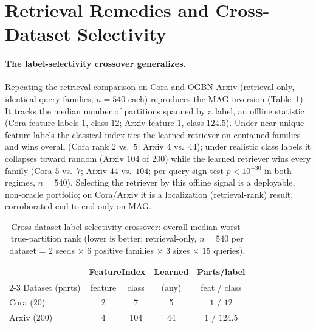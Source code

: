 \documentclass{article}
\begin{document}
\section{Retrieval Remedies and Cross-Dataset Selectivity}
\label{app:probes}

\paragraph{The label-selectivity crossover generalizes.} Repeating the retrieval comparison on Cora and OGBN-Arxiv (retrieval-only, identical query families, $n{=}540$ each) reproduces the MAG inversion (Table~\ref{tab:selectivity_xd_log}). It tracks the median number of partitions spanned by a label, an offline statistic (Cora feature labels $1$, class $12$; Arxiv feature $1$, class $124.5$). Under near-unique feature labels the classical index ties the learned retriever on contained families and wins overall (Cora rank $2$ vs.\ $5$; Arxiv $4$ vs.\ $44$); under realistic class labels it collapses toward random (Arxiv $104$ of $200$) while the learned retriever wins every family (Cora $5$ vs.\ $7$; Arxiv $44$ vs.\ $104$; per-query sign test $p<10^{-30}$ in both regimes, $n{=}540$). Selecting the retriever by this offline signal is a deployable, non-oracle portfolio; on Cora/Arxiv it is a localization (retrieval-rank) result, corroborated end-to-end only on MAG.

\begin{table}[H]
\centering
\caption{Cross-dataset label-selectivity crossover: overall median worst-true-partition rank (lower is better; retrieval-only, $n{=}540$ per dataset = 2 seeds $\times$ 6 positive families $\times$ 3 sizes $\times$ 15 queries).}
\label{tab:selectivity_xd_log}
\small
\begin{tabular}{lcccc}
\toprule
 & \multicolumn{2}{c}{FeatureIndex} & Learned & Parts/label \\
\cmidrule(lr){2-3}
Dataset (parts) & feature & class & (any) & feat / class \\
\midrule
Cora ($20$)   & 2 & 7   & 5  & $1$ / $12$ \\
Arxiv ($200$) & 4 & 104 & 44 & $1$ / $124.5$ \\
\bottomrule
\end{tabular}
\end{table}
\end{document}
